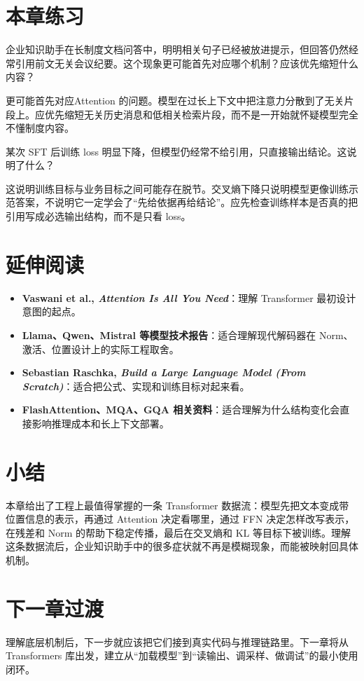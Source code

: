 \section{本章练习}
\begin{exercise}[长上下文答偏]
企业知识助手在长制度文档问答中，明明相关句子已经被放进提示，但回答仍然经常引用前文无关会议纪要。这个现象更可能首先对应哪个机制？应该优先缩短什么内容？
\end{exercise}

\begin{solution}
更可能首先对应{\heiti Attention} 的问题。模型在过长上下文中把注意力分散到了无关片段上。应优先缩短无关历史消息和低相关检索片段，而不是一开始就怀疑模型完全不懂制度内容。
\end{solution}

\begin{exercise}[损失与业务目标]
某次 SFT 后训练 loss 明显下降，但模型仍经常不给引用，只直接输出结论。这说明了什么？
\end{exercise}

\begin{solution}
这说明{\heiti 训练目标与业务目标之间可能存在脱节}。交叉熵下降只说明模型更像训练示范答案，不说明它一定学会了“先给依据再给结论”。应先检查训练样本是否真的把引用写成必选输出结构，而不是只看 loss。
\end{solution}

\section{延伸阅读}
\begin{itemize}
  \item \textbf{Vaswani et al., \emph{Attention Is All You Need}}：理解 Transformer 最初设计意图的起点。
  \item \textbf{Llama、Qwen、Mistral 等模型技术报告}：适合理解现代解码器在 Norm、激活、位置设计上的实际工程取舍。
  \item \textbf{Sebastian Raschka, \emph{Build a Large Language Model (From Scratch)}}：适合把公式、实现和训练目标对起来看。
  \item \textbf{FlashAttention、MQA、GQA 相关资料}：适合理解为什么结构变化会直接影响推理成本和长上下文部署。
\end{itemize}

\section{小结}
本章给出了工程上最值得掌握的一条 Transformer 数据流：模型先把文本变成带位置信息的表示，再通过 Attention 决定看哪里，通过 FFN 决定怎样改写表示，在残差和 Norm 的帮助下稳定传播，最后在交叉熵和 KL 等目标下被训练。理解这条数据流后，企业知识助手中的很多症状就不再是模糊现象，而能被映射回具体机制。

\section{下一章过渡}
理解底层机制后，下一步就应该把它们接到真实代码与推理链路里。下一章将从 Transformers 库出发，建立从“加载模型”到“读输出、调采样、做调试”的最小使用闭环。
